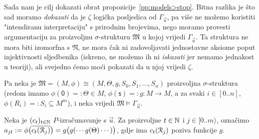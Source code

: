Sada nam je cilj dokazati obrat propozicije~\ref{pp:models>stop}. Bitna razlika je što sad moramo \emph{dokazati} da je $\zeta$ logička posljedica od $\Gamma_{\vec u}$, pa više ne možemo koristiti "intendiranu interpretaciju" s prirodnim brojevima, nego moramo provesti argumentaciju za proizvoljnu $\sigma$-strukturu $\mathfrak M$ u kojoj vrijedi $\Gamma_{\vec u}$. Ta struktura ne mora biti izomorfna s $\mathfrak N$, ne mora čak ni zadovoljavati jednostavne aksiome poput injektivnosti sljedbenika (iskreno, ne možemo ih ni \emph{iskazati} jer nemamo jednakost u teoriji), ali svejedno ćemo moći pokazati da u njoj vrijedi $\zeta$.

Pa neka je $\mathfrak M=(M,\phi)\cong(M,\Theta,g,S_0,S_1,\dotsc,S_n)$ proizvoljna $\sigma$-struktura (redom imamo $\phi(\mathsf0)=:\Theta\in M$, $\phi(\mathsf s)=:g\colon M\to M$, a za svaki $i\in[0..n]$, $\phi(R_i)=:S_i\subseteq M^m$), i neka vrijedi $\mathfrak M\models\Gamma_{\vec u}$.

Neka je $(c_t)_{t\in{\mathbb N}}$ $P$-izračunavanje s $\vec u$. Za proizvoljne $t\in{\mathbb N}$ i $j\in[0..m\rangle$, označimo $a_{jt}:=\phi\bigl(\overline{c_t(\mathcal R_{j})}\bigr)=g\bigl(g(\dotsb g(\Theta)\dotsb)\bigr)$, gdje ima $c_t(\mathcal R_{j})$ poziva funkcije $g$.

